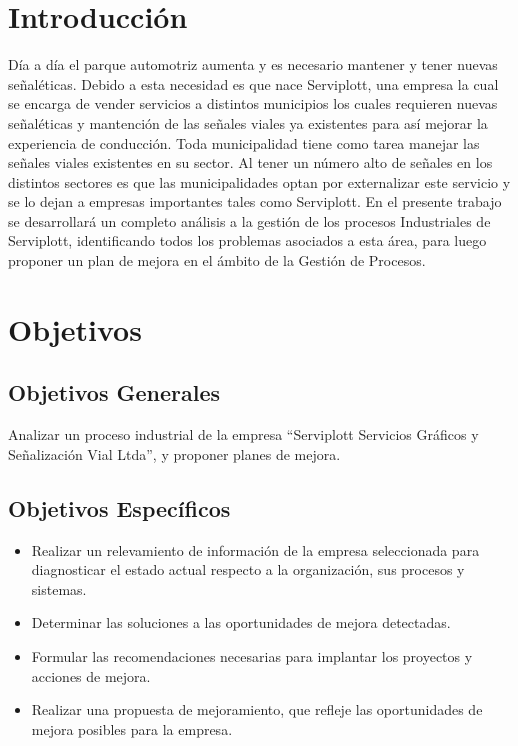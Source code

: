%
%

\section{Introducción}
Día a día el parque automotriz aumenta y es necesario mantener y tener nuevas señaléticas. Debido a esta necesidad es que nace Serviplott, una empresa la cual se encarga de vender servicios a distintos municipios los cuales requieren nuevas señaléticas y mantención de las señales viales ya existentes para así mejorar la experiencia de conducción.
\vspace{5mm}
Toda municipalidad tiene como tarea manejar las señales viales existentes en su sector. Al tener un número alto de señales en los distintos sectores es que las municipalidades optan por externalizar este servicio y se lo dejan a empresas importantes tales como Serviplott.
\vspace{5mm}
En el presente trabajo se desarrollará un completo análisis a la gestión de los procesos Industriales de Serviplott, identificando todos los problemas asociados a esta área, para luego proponer un plan de mejora en el ámbito de la Gestión de Procesos.
\vspace{5mm}
\newpage
\section{Objetivos}
	\subsection{Objetivos Generales}
Analizar un proceso industrial de la empresa “Serviplott Servicios Gráficos y Señalización Vial Ltda”, y proponer planes de mejora.
	\subsection{Objetivos Específicos}
	\begin{itemize}

		\item Realizar un relevamiento de información de la empresa seleccionada para 					diagnosticar el estado actual respecto a la organización, sus procesos 				y sistemas.
		\item Determinar las soluciones a las oportunidades de mejora detectadas.
		\item Formular las recomendaciones necesarias para implantar los proyectos y
		acciones de mejora.
		\item Realizar una propuesta de mejoramiento, que refleje las oportunidades de 		mejora posibles para la empresa.
	\end{itemize}
	\newpage
